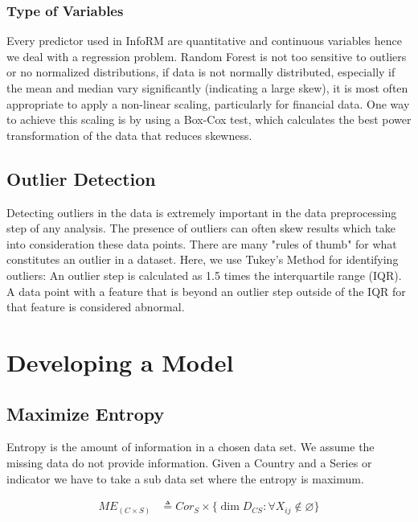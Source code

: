 \documentclass[a4project, twocolumn]{article}
\newcommand{\Para}[1]{\left( #1 \right)}
\begin{document}
\subsubsection{Type of Variables}

Every predictor used in InfoRM are quantitative and continuous variables hence we deal with a regression problem. Random Forest is not too sensitive to outliers or no normalized distributions, if data is not normally distributed, especially if the mean and median vary significantly (indicating a large skew), it is most often appropriate to apply a non-linear scaling, particularly for financial data. One way to achieve this scaling is by using a Box-Cox test, which calculates the best power transformation of the data that reduces skewness.


\subsection{Outlier Detection}

Detecting outliers in the data is extremely important in the data preprocessing step of any analysis. The presence of outliers can often skew results which take into consideration these data points. There are many "rules of thumb" for what constitutes an outlier in a dataset. Here, we use Tukey's Method for identifying outliers: An outlier step is calculated as 1.5 times the interquartile range (IQR). A data point with a feature that is beyond an outlier step outside of the IQR for that feature is considered abnormal.

\section{Developing a Model}
 
\subsection{Maximize Entropy}

Entropy is the amount of information in a chosen data set. We assume the missing data do not provide information. Given a Country and a Series or indicator we have to take a sub data set where the entropy is maximum.

\begin{align*}
    ME_{\Para{C \times S}} &\triangleq Cor_{S} \times \{ \dim{D_{CS}}\colon \forall X_{ij} \notin \varnothing \}  
\end{align*}
\end{document}
